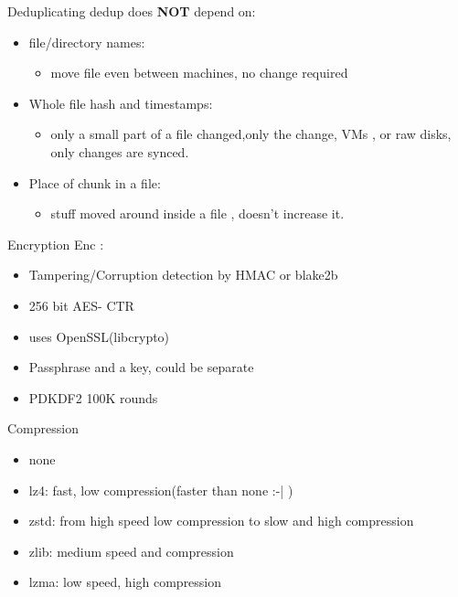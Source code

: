 \documentclass{beamer}
\begin{document}
\begin{frame}{Deduplicating}
	dedup does \textbf{NOT} depend on:
	\begin{itemize}
		\item file/directory names: 
		\begin{itemize}
			\item move file even between machines, no change required
		\end{itemize}
		 \item Whole file hash and timestamps:
		 \begin{itemize} 
		 	\item only a small part of a file changed,only the change, VMs , or raw disks, only changes are synced.
		\end{itemize}
		
		\item Place of chunk in a file:
		\begin{itemize}
			\item stuff moved around inside a file , doesn't increase it.
		\end{itemize} 
	
	\end{itemize}
\end{frame}

%	
%	
%	
%	

\begin{frame}{Encryption}
	Enc :
	\begin{itemize}
		\item  Tampering/Corruption detection by HMAC or blake2b
		
		\item 256 bit AES- CTR
		
		\item uses OpenSSL(libcrypto)
		
		\item Passphrase and a key, could be separate
		
		\item PDKDF2 100K rounds
		
	\end{itemize}
\end{frame}

\begin{frame}{Compression}
\begin{itemize}
	\item none
	\item lz4: fast, low compression(faster than none :-| )
	\item zstd: from high speed low compression to slow and high compression 
	\item zlib: medium speed and compression
	\item lzma: low speed, high compression
\end{itemize}
\end{frame}
\end{document}
